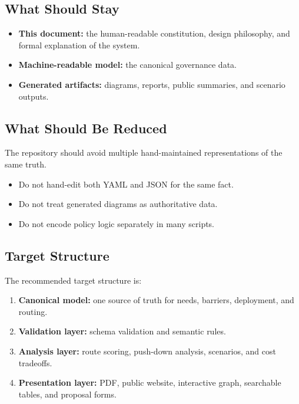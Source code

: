 \documentclass[11pt,a4paper]{article}
\begin{document}
\subsection{What Should Stay}

\begin{itemize}
    \item \textbf{This document:} the human-readable constitution, design philosophy, and formal explanation of the system.
    \item \textbf{Machine-readable model:} the canonical governance data.
    \item \textbf{Generated artifacts:} diagrams, reports, public summaries, and scenario outputs.
\end{itemize}

\subsection{What Should Be Reduced}

The repository should avoid multiple hand-maintained representations of the same truth.

\begin{itemize}
    \item Do not hand-edit both YAML and JSON for the same fact.
    \item Do not treat generated diagrams as authoritative data.
    \item Do not encode policy logic separately in many scripts.
\end{itemize}

\subsection{Target Structure}

The recommended target structure is:

\begin{enumerate}
    \item \textbf{Canonical model:} one source of truth for needs, barriers, deployment, and routing.
    \item \textbf{Validation layer:} schema validation and semantic rules.
    \item \textbf{Analysis layer:} route scoring, push-down analysis, scenarios, and cost tradeoffs.
    \item \textbf{Presentation layer:} PDF, public website, interactive graph, searchable tables, and proposal forms.
\end{enumerate}
\end{document}
